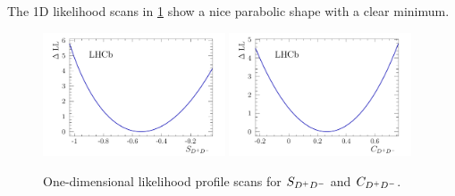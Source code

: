 The 1D likelihood scans in \cref{fig:b02dd:decaytimefit:1DLLScan} show a nice
parabolic shape with a clear minimum.
\begin{figure}[htb]
\centering
\includegraphics[width=0.48\textwidth]{07-B02DD/tikz/pdf/Likelihoodscan_sin2b.pdf}
\includegraphics[width=0.48\textwidth]{07-B02DD/tikz/pdf/Likelihoodscan_C.pdf}
\caption{One-dimensional likelihood profile scans for $S_{{{D}^+}{{D}^-}}$ and $C_{{{D}^+}{{D}^-}}$.}
\label{fig:b02dd:decaytimefit:1DLLScan}
\end{figure}


